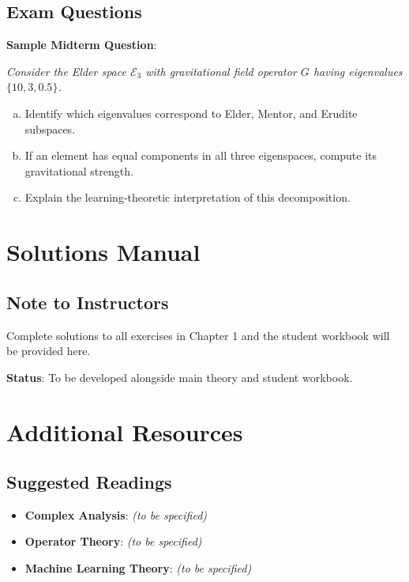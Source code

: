 \documentclass[12pt,a4paper]{article}
\begin{document}
\subsection{Exam Questions}

\textbf{Sample Midterm Question}:

\textit{Consider the Elder space $\mathcal{E}_3$ with gravitational field operator $G$ having eigenvalues $\{10, 3, 0.5\}$. }

\begin{enumerate}[(a)]
    \item Identify which eigenvalues correspond to Elder, Mentor, and Erudite subspaces.
    \item If an element has equal components in all three eigenspaces, compute its gravitational strength.
    \item Explain the learning-theoretic interpretation of this decomposition.
\end{enumerate}

\section{Solutions Manual}

\subsection{Note to Instructors}

Complete solutions to all exercises in Chapter 1 and the student workbook will be provided here.

\textbf{Status}: To be developed alongside main theory and student workbook.

\section{Additional Resources}

\subsection{Suggested Readings}

\begin{itemize}
    \item \textbf{Complex Analysis}: \textit{(to be specified)}
    \item \textbf{Operator Theory}: \textit{(to be specified)}
    \item \textbf{Machine Learning Theory}: \textit{(to be specified)}
\end{itemize}
\end{document}
